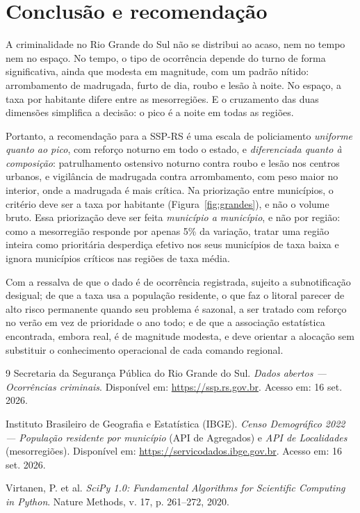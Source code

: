 \documentclass[a4paper,11pt]{article}
\begin{document}
\section{Conclusão e recomendação}\label{sec:conclusao}
A criminalidade no Rio Grande do Sul não se distribui ao acaso, nem no tempo nem
no espaço. No tempo, o tipo de ocorrência depende do turno de forma
significativa, ainda que modesta em magnitude, com um padrão nítido:
arrombamento de madrugada, furto de dia, roubo e lesão à noite. No espaço, a taxa
por habitante difere entre as mesorregiões. E o cruzamento das duas dimensões
simplifica a decisão: o pico é a noite em todas as regiões.

Portanto, a recomendação para a SSP-RS é uma escala de policiamento
\emph{uniforme quanto ao pico}, com reforço noturno em todo o estado, e
\emph{diferenciada quanto à composição}: patrulhamento ostensivo noturno contra
roubo e lesão nos centros urbanos, e vigilância de madrugada contra arrombamento,
com peso maior no interior, onde a madrugada é mais crítica. Na priorização entre
municípios, o critério deve ser a taxa por habitante (Figura~\ref{fig:grandes}), e
não o volume bruto. Essa priorização deve ser feita \emph{município a município},
e não por região: como a mesorregião responde por apenas 5\% da variação, tratar
uma região inteira como prioritária desperdiça efetivo nos seus municípios de taxa
baixa e ignora municípios críticos nas regiões de taxa média.

Com a ressalva de que o dado é de ocorrência registrada, sujeito a
subnotificação desigual; de que a taxa usa a população residente, o que faz o
litoral parecer de alto risco permanente quando seu problema é sazonal, a ser
tratado com reforço no verão em vez de prioridade o ano todo; e de que a
associação estatística encontrada, embora real, é de magnitude modesta, e deve
orientar a alocação sem substituir o conhecimento operacional de cada comando
regional.

\begin{thebibliography}{9}
Secretaria da Segurança Pública do Rio Grande do Sul.
\textit{Dados abertos --- Ocorrências criminais}.
Disponível em: \url{https://ssp.rs.gov.br}. Acesso em: 16 set. 2026.

Instituto Brasileiro de Geografia e Estatística (IBGE).
\textit{Censo Demográfico 2022 --- População residente por município} (API de
Agregados) e \textit{API de Localidades} (mesorregiões).
Disponível em: \url{https://servicodados.ibge.gov.br}. Acesso em: 16 set. 2026.

Virtanen, P. et al. \textit{SciPy 1.0: Fundamental Algorithms for Scientific
Computing in Python}. Nature Methods, v. 17, p. 261--272, 2020.
\end{thebibliography}
\end{document}
